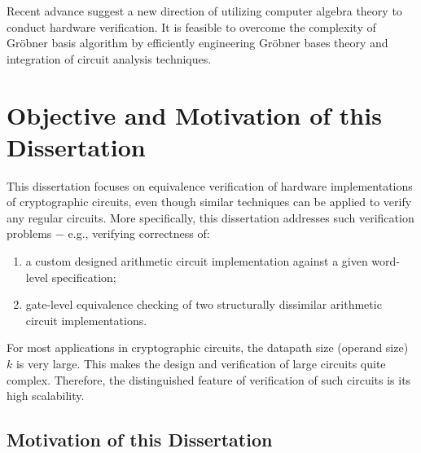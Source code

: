 Recent advance \cite{wienand:cav08} \cite{lv:hldvt2011} \cite{wedler:date11} \cite{lv:vlsi2012} \cite{lv:date2012}
suggest a new direction of utilizing computer algebra theory to conduct hardware verification. 
It is feasible to overcome the complexity of Gr\"obner basis algorithm
by efficiently engineering Gr\"obner bases theory and integration of circuit analysis techniques.


\section{Objective and Motivation of this Dissertation}

This dissertation focuses on equivalence verification of hardware implementations of
cryptographic circuits, even though similar techniques can be applied to verify any regular circuits. 
More specifically, this dissertation addresses such verification problems $-$ e.g., verifying correctness of:
\begin{enumerate}
\item a custom designed arithmetic circuit implementation against a given word-level specification;
\item gate-level equivalence checking of two structurally dissimilar arithmetic circuit implementations. 
\end{enumerate}

For most applications in cryptographic circuits, the datapath size (operand size) $k$ is very large. 
This makes the design and verification of large circuits quite complex. Therefore, the distinguished feature of verification of such circuits 
is its high scalability. 

\subsection{Motivation of this Dissertation}

